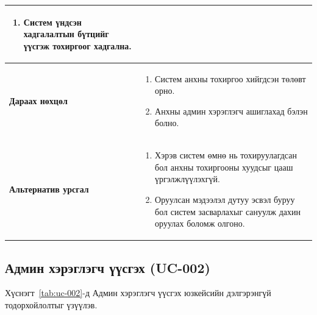 \begin{table}[H]
\begin{tabular}{|p{3.8cm}|p{10.2cm}|}
\begin{enumerate}
            \item Систем үндсэн хадгалалтын бүтцийг үүсгэж тохиргоог хадгална.
        \end{enumerate}
        \\ \hline
        \textbf{Дараах нөхцөл} &
        \begin{enumerate}
            \item Систем анхны тохиргоо хийгдсэн төлөвт орно.
            \item Анхны админ хэрэглэгч ашиглахад бэлэн болно.
        \end{enumerate}
        \\ \hline
        \textbf{Альтернатив урсгал} &
        \begin{enumerate}
            \item Хэрэв систем өмнө нь тохируулагдсан бол анхны тохиргооны хуудсыг цааш үргэлжлүүлэхгүй.
            \item Оруулсан мэдээлэл дутуу эсвэл буруу бол систем засварлахыг сануулж дахин оруулах боломж олгоно.
        \end{enumerate}
        \\ \hline
    \end{tabular}
\end{table}

\subsection{Админ хэрэглэгч үүсгэх (UC-002)}

Хүснэгт~\ref{tab:uc-002}-д Админ хэрэглэгч үүсгэх юзкейсийн дэлгэрэнгүй тодорхойлолтыг үзүүлэв.

